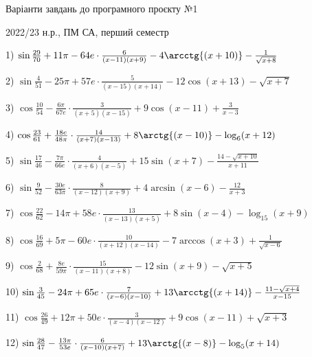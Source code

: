\documentclass[11pt,ukrainian]{article}
\begin{document}
{\Large \center  Варіанти завдань до програмного проєкту №1\par 2022/23 н.р., ПМ СА, перший семестр\par \bigskip}
1) \space 
{ ${\sin\frac{29}{70}} + 11{\pi} - 64 e\cdot {\frac{6}{(x - 11)(x + 9)}} - {4\arcctg{(x + 10)}} - {\frac{1}{\sqrt{x + 8}}}$}
\smallskip\par
2) \space 
{ ${\sin\frac{4}{51}} - 25{\pi} + 57 e\cdot {\frac{5}{(x - 15)(x + 14)}} - {12\cos{(x + 13)}} - {\sqrt{x + 7}}$}
\smallskip\par
3) \space 
{ ${\cos\frac{10}{54}} - \frac{6{\pi}}{67 e}\cdot {\frac{3}{(x + 5)(x - 15)}} + {9\cos{(x - 11)}} + { \frac{3}{x - 3}}$}
\smallskip\par
4) \space 
{ ${\cos\frac{23}{61}} + \frac{18 e}{48{\pi}}\cdot {\frac{14}{(x + 7)(x - 13)}} + {8\arctg{(x - 10)}} - {\log_{6}(x + 12)}$}
\smallskip\par
5) \space 
{ ${\sin\frac{17}{46}} - \frac{7{\pi}}{66 e}\cdot {\frac{4}{(x + 6)(x - 5)}} + {15\sin{(x + 7)}} - {\frac{14 - \sqrt{x + 10}}{x + 11}}$}
\smallskip\par
6) \space 
{ ${\sin\frac{9}{52}} - \frac{30 e}{63{\pi}}\cdot {\frac{8}{(x - 12)(x + 9)}} + {4\arcsin{(x - 6)}} - { \frac{12}{x + 3}}$}
\smallskip\par
7) \space 
{ ${\cos\frac{22}{62}} - 14{\pi} + 58 e\cdot {\frac{13}{(x - 13)(x + 5)}} + {8\sin{(x - 4)}} - {\log_{15}(x + 9)}$}
\smallskip\par
8) \space 
{ ${\cos\frac{16}{69}} + 5{\pi} - 60 e\cdot {\frac{10}{(x + 12)(x - 14)}} - {7\arccos{(x + 3)}} + {\frac{1}{\sqrt{x - 6}}}$}
\smallskip\par
9) \space 
{ ${\cos\frac{2}{68}} + \frac{8 e}{59{\pi}}\cdot {\frac{15}{(x - 11)(x + 8)}} - {12\sin{(x + 9)}} - {\sqrt{x + 5}}$}
\smallskip\par
10) \space 
{ ${\sin\frac{3}{45}} - 24{\pi} + 65 e\cdot {\frac{7}{(x - 6)(x - 10)}} + {13\arcctg{(x + 14)}} - {\frac{11 - \sqrt{x + 4}}{x - 15}}$}
\smallskip\par
11) \space 
{ ${\cos\frac{26}{49}} + 12{\pi} + 50 e\cdot {\frac{3}{(x - 4)(x - 12)}} + {9\cos{(x - 11)}} + {\sqrt{x + 3}}$}
\smallskip\par
12) \space 
{ ${\sin\frac{28}{47}} - \frac{13{\pi}}{53 e}\cdot {\frac{6}{(x - 10)(x + 7)}} + {13\arctg{(x - 8)}} - {\log_{5}(x + 14)}$}
\smallskip\par
\end{document}
